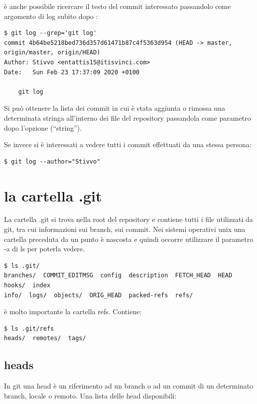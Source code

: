 \documentclass{article} \usepackage[textwidth=19cm,textheight=24cm]{geometry}
\begin{document}
è anche possibile ricercare il testo del commit interessato passandolo come
argomento di log subito dopo :

\begin{verbatim}
$ git log --grep='git log'
commit 4b64be5218bed736d357d61471b87c4f5363d954 (HEAD -> master, origin/master, origin/HEAD)
Author: Stivvo <entattis15@itisvinci.com>
Date:   Sun Feb 23 17:37:09 2020 +0100

    git log
\end{verbatim}

Si può ottenere la lista dei commit in cui è stata aggiunta o rimossa una
determinata stringa all'interno dei file del repository passandola come
parametro dopo l'opzione  (``string'').

Se invece si è interessati a vedere tutti i commit effettuati da una stessa
persona:

\begin{verbatim}
$ git log --author="Stivvo"
\end{verbatim}

\section{la cartella .git}

La cartella .git si trova nella root del repository e contiene tutti i file
utilizzati da git, tra cui informazioni sui branch, sui commit. Nei sistemi
operativi unix una cartella preceduta da un punto è nascosta e quindi occorre
utilizzare il parametro -a di ls per poterla vedere.

\begin{verbatim}
$ ls .git/
branches/  COMMIT_EDITMSG  config  description  FETCH_HEAD  HEAD  hooks/  index  
info/  logs/  objects/  ORIG_HEAD  packed-refs  refs/
\end{verbatim}

è molto importante la cartella refs. Contiene:

\begin{verbatim}
$ ls .git/refs
heads/  remotes/  tags/
\end{verbatim}

\subsection{heads}

In git una head è un riferimento ad un branch o ad un commit di un determinato
branch, locale o remoto. Una lista delle head disponibili:
\end{document}
